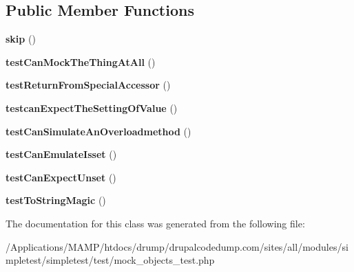 \subsection*{Public Member Functions}
\begin{DoxyCompactItemize}
\item 
\hypertarget{class_test_of_special_methods_a8944945fa65ef69c928e13bb3e9ff7d8}{
{\bfseries skip} ()}
\label{class_test_of_special_methods_a8944945fa65ef69c928e13bb3e9ff7d8}

\item 
\hypertarget{class_test_of_special_methods_a57578fd26ac0c465cb084f53d93fe06a}{
{\bfseries testCanMockTheThingAtAll} ()}
\label{class_test_of_special_methods_a57578fd26ac0c465cb084f53d93fe06a}

\item 
\hypertarget{class_test_of_special_methods_a322dae57c041002f36a080d3ffc2dc2e}{
{\bfseries testReturnFromSpecialAccessor} ()}
\label{class_test_of_special_methods_a322dae57c041002f36a080d3ffc2dc2e}

\item 
\hypertarget{class_test_of_special_methods_a9f6d9c5de85b39ebd4024bc3d244713f}{
{\bfseries testcanExpectTheSettingOfValue} ()}
\label{class_test_of_special_methods_a9f6d9c5de85b39ebd4024bc3d244713f}

\item 
\hypertarget{class_test_of_special_methods_abe839fc03ab5f0fc6270bfcd215811e6}{
{\bfseries testCanSimulateAnOverloadmethod} ()}
\label{class_test_of_special_methods_abe839fc03ab5f0fc6270bfcd215811e6}

\item 
\hypertarget{class_test_of_special_methods_a5e07b76840afd93cd42ba1b889d2a558}{
{\bfseries testCanEmulateIsset} ()}
\label{class_test_of_special_methods_a5e07b76840afd93cd42ba1b889d2a558}

\item 
\hypertarget{class_test_of_special_methods_ae75f76e3c06f0026fb99f3710390a623}{
{\bfseries testCanExpectUnset} ()}
\label{class_test_of_special_methods_ae75f76e3c06f0026fb99f3710390a623}

\item 
\hypertarget{class_test_of_special_methods_a053261a48400be0a02d1d496e24c422d}{
{\bfseries testToStringMagic} ()}
\label{class_test_of_special_methods_a053261a48400be0a02d1d496e24c422d}

\end{DoxyCompactItemize}


The documentation for this class was generated from the following file:\begin{DoxyCompactItemize}
\item 
/Applications/MAMP/htdocs/drump/drupalcodedump.com/sites/all/modules/simpletest/simpletest/test/mock\_\-objects\_\-test.php\end{DoxyCompactItemize}
